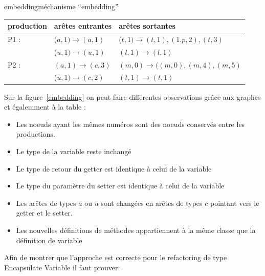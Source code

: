 \documentclass[a4paper, 12pt]{article}
\begin{document}
\begin{myfig}{embedding}{méchanisme ``embedding''}
\begin{center}
    \end{center}


    \begin{tabular}{ | l | l |  l |}
      \hline production & arêtes entrantes & arêtes sortantes  \\ \hline
      P1 : & (\(a,1) {\rightarrow} (a,1)\) &  (\(t,1) {\rightarrow}(t,1),(1.p,2),(t,3)\)   \\ \hline
      & (\(u,1) {\rightarrow} (u,1)\) & \( (l,1) {\rightarrow} (l,1)\)  \\ \hline
      P2 : & \((a,1) {\rightarrow} (c,3)\) &  \((m,0) {\rightarrow} ((m,0),(m,4),(m,5)\)    \\ \hline
      & (\(u,1) {\rightarrow} (c,2)\) &  \((t,1) {\rightarrow} (t,1)\)  \\ \hline
    \end{tabular}
  \end{myfig}

  Sur la figure~\ref{embedding} on peut faire différentes observations grâce aux graphes et égalemment à la table :

  \begin{itemize}[label=\textbullet]
    \item Les noeuds ayant les mêmes numéros sont des noeuds conservés entre les productions.
    \item Le type de la variable reste inchangé
    \item Le type de retour du getter est identique à celui de la variable
    \item Le type du paramètre du setter est identique à celui de la variable
    \item Les arêtes de types \(a\) ou \(u\) sont changées en arêtes de types \(c\) pointant vers le getter et le setter.
    \item Les nouvelles définitions de méthodes appartiennent à la même classe que la définition de variable
  \end{itemize}

  Afin de montrer que l'approche est correcte pour le refactoring de type Encapsulate Variable il faut prouver:
\end{document}
